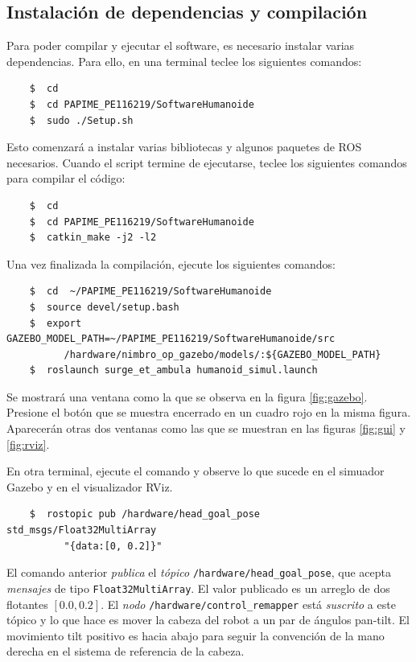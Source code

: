 \documentclass[letterpaper,12pt]{article}
\begin{document}
\subsection{Instalación de dependencias y compilación}
Para poder compilar y ejecutar el software, es necesario instalar varias dependencias. Para ello, en una terminal teclee los siguientes comandos:
\begin{verbatim}
    $  cd
    $  cd PAPIME_PE116219/SoftwareHumanoide
    $  sudo ./Setup.sh
\end{verbatim}

Esto comenzará a instalar varias bibliotecas y algunos paquetes de ROS necesarios. Cuando el script termine de ejecutarse, teclee los siguientes comandos para compilar el código:
\begin{verbatim}
    $  cd
    $  cd PAPIME_PE116219/SoftwareHumanoide
    $  catkin_make -j2 -l2
\end{verbatim}

Una vez finalizada la compilación, ejecute los siguientes comandos:

\begin{verbatim}
    $  cd  ~/PAPIME_PE116219/SoftwareHumanoide
    $  source devel/setup.bash
    $  export GAZEBO_MODEL_PATH=~/PAPIME_PE116219/SoftwareHumanoide/src
          /hardware/nimbro_op_gazebo/models/:${GAZEBO_MODEL_PATH}
    $  roslaunch surge_et_ambula humanoid_simul.launch
\end{verbatim}

Se mostrará una ventana como la que se observa en la figura \ref{fig:gazebo}. Presione el botón que se muestra encerrado en un cuadro rojo en la misma figura. Aparecerán otras dos ventanas como las que se muestran en las figuras \ref{fig:gui} y \ref{fig:rviz}.

En otra terminal, ejecute el comando y observe lo que sucede en el simuador Gazebo y en el visualizador RViz. 
\begin{verbatim}
    $  rostopic pub /hardware/head_goal_pose std_msgs/Float32MultiArray 
          "{data:[0, 0.2]}"
\end{verbatim}

El comando anterior \textit{publica} el \textit{tópico} \texttt{/hardware/head\_goal\_pose}, que acepta \textit{mensajes} de tipo \texttt{Float32MultiArray}. El valor publicado es un arreglo de dos flotantes $[0.0, 0.2]$. El \textit{nodo} \texttt{/hardware/control\_remapper} está \textit{suscrito} a este tópico y lo que hace es mover la cabeza del robot a un par de ángulos pan-tilt. El movimiento tilt positivo es hacia abajo para seguir la convención de la mano derecha en el sistema de referencia de la cabeza. 
\end{document}
